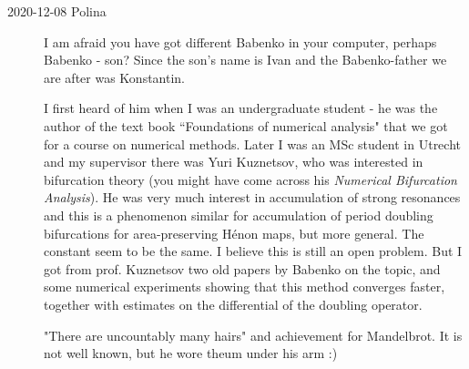 \begin{description}
\item[2020-12-08 Polina]
I am afraid you have got different Babenko in your computer, perhaps
Babenko - 
{son}? Since the son's name is Ivan and the Babenko-father we are after
was Konstantin.

I first heard of him when I was an undergraduate student - he was the
author of the text book ``Foundations of numerical analysis" that we got
for a course on numerical methods. Later I was an MSc student in Utrecht
and my supervisor there was Yuri Kuznetsov, who was interested in
bifurcation theory (you might have come across his {\em
Numerical Bifurcation Analysis}). He was very much interest in
accumulation of strong resonances and this is a phenomenon similar for
accumulation of period doubling bifurcations for area-preserving H\'enon
maps, but more general. The constant seem to be the same. I believe this
is still an open problem. But I got from prof. Kuznetsov two old papers
by Babenko on the topic, and some numerical experiments showing that this
method converges faster, together with estimates on the differential of
the doubling operator.

"There are uncountably many hairs"
and achievement for Mandelbrot. It is not well known, but he wore theum under his arm :)

\end{description}



\printbibliography[heading=subbibintoc,title={References}]
